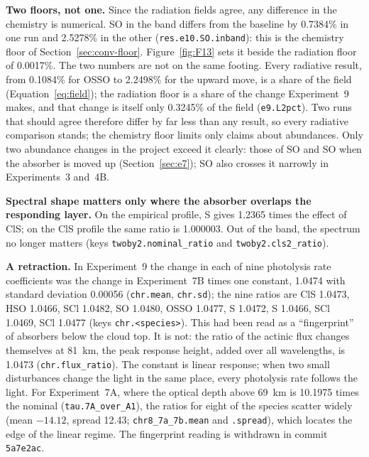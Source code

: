 \textbf{Two floors, not one.} Since the radiation fields agree, any difference in the
chemistry is numerical. SO in the band differs from the baseline by 0.7384\% in one run
and 2.5278\% in the other (\texttt{res.e10.SO.inband}): this is the chemistry floor of
Section~\ref{sec:conv-floor}. Figure~\ref{fig:F13} sets it beside the radiation floor of
0.0017\%. The two numbers are not on the same footing. Every radiative result, from
0.1084\% for OSSO to 2.2498\% for the upward move, is a share of the field
(Equation~\eqref{eq:field}); the radiation floor is a share of the change Experiment~9
makes, and that change is itself only 0.3245\% of the field (\texttt{e9.L2pct}). Two runs
that should agree therefore differ by far less than any result, so every radiative
comparison stands; the chemistry floor limits only claims about abundances. Only two abundance changes in the
project exceed it clearly: those of SO and SO when the absorber is moved up
(Section~\ref{sec:e7}); SO also crosses it narrowly in Experiments~3 and~4B.

\textbf{Spectral shape matters only where the absorber overlaps the responding layer.}
On the empirical profile, S gives 1.2365 times the effect of ClS; on the
ClS profile the same ratio is 1.000003. Out of the band, the spectrum no longer
matters (keys \texttt{twoby2.nominal\_ratio} and \texttt{twoby2.cls2\_ratio}).

\textbf{A retraction.} In Experiment~9 the change in each of nine photolysis rate
coefficients was the change in Experiment~7B times one constant, 1.0474 with standard
deviation 0.00056 (\texttt{chr.mean}, \texttt{chr.sd}); the nine ratios are ClS 1.0473, HSO 1.0466, SCl 1.0482, SO 1.0480, OSSO 1.0477, S 1.0472, S 1.0466, SCl 1.0469, SCl 1.0477 (keys \texttt{chr.<species>}). This had been read as a
``fingerprint'' of absorbers below the cloud top. It is not: the ratio of the actinic flux
changes themselves at 81~km, the peak response height, added over all wavelengths, is
1.0473 (\texttt{chr.flux\_ratio}). The constant is linear response; when two small disturbances
change the light in the same place, every photolysis rate follows the light. For
Experiment~7A, where the optical depth above 69~km is 10.1975 times the nominal
(\texttt{tau.7A\_over\_A1}), the ratios for eight of the species scatter widely (mean $-14.12$, spread 12.43;
\texttt{chr8\_7a\_7b.mean} and \texttt{.spread}),
which locates the edge of the linear regime. The fingerprint reading is withdrawn in
commit \texttt{5a7e2ac}.


